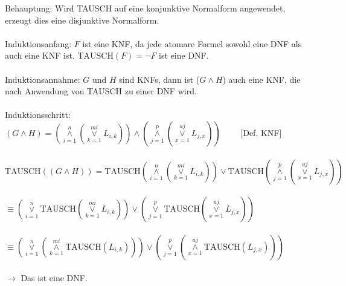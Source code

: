 \documentclass[a4paper,10pt]{scrartcl}
\begin{document}
\begin{enumerate}
\begin{enumerate}[1.]
 Behauptung: Wird TAUSCH auf eine konjunktive Normalform angewendet, erzeugt dies eine disjunktive Normalform. \\
 \\
 Induktionsanfang: $F$ ist eine KNF, da jede atomare Formel sowohl eine DNF als auch eine KNF ist. 
 $\text{TAUSCH}(F) = \neg F$ ist eine DNF. \\
 \\
 Induktionsannahme: $G$ und $H$ sind KNFs, dann ist ($G \wedge H$) auch eine KNF, die nach Anwendung von TAUSCH zu
 einer DNF wird. \\
 \\
 Induktionsschritt: \\
	$(G \wedge H) = (\overset{n}{\underset{i=1}{\wedge}} (\overset{mi}{\underset{k=1}{\vee}} L_{i,k})) \wedge  
	(\overset{p}{\underset{j=1}{\wedge}} (\overset{uj}{\underset{x=1}{\vee}} L_{j,x}))\quad \quad $ [Def. KNF] \\ \\
	$\text{TAUSCH}((G\wedge H)) = \text{TAUSCH}(\overset{n}{\underset{i=1}{\wedge}} (\overset{mi}{\underset{k=1}{\vee}} L_{i,k})) \vee \text{TAUSCH}(\overset{p}{\underset{j=1}{\wedge}} (\overset{uj}{\underset{x=1}{\vee}} L_{j,x}))$ \\ \\
	$\equiv (\overset{n}{\underset{i=1}{\vee}} \text{TAUSCH}(\overset{mi}{\underset{k=1}{\vee}} L_{i,k})) \vee (\overset{p}{\underset{j=1}{\vee}} \text{TAUSCH}(\overset{uj}{\underset{x=1}{\vee}} L_{j,x}))$ \\ \\
	$\equiv (\overset{n}{\underset{i=1}{\vee}} (\overset{mi}{\underset{k=1}{\wedge}} \text{TAUSCH}(L_{i,k}))) \vee (\overset{p}{\underset{j=1}{\vee}} (\overset{uj}{\underset{x=1}{\wedge}} \text{TAUSCH}(L_{j,x})))$ \\ \\
	$\rightarrow $ Das ist eine DNF.


\end{enumerate}
\end{enumerate}
\end{document}
